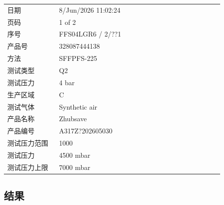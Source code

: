 \documentclass[UTF8,10pt,a4paper,fontset=fandol]{ctexart}
\newcommand{\fieldvalue}[1]{#1}
\begin{document}
\begin{tabular}{@{}p{0.22\linewidth}p{0.70\linewidth}@{}}
日期 &
\fieldvalue{8/Jun/2026 11:02:24} \\

页码 &
\fieldvalue{1 of 2} \\

序号 &
\fieldvalue{FFS04LGR6 / 2/??1} \\

产品号 &
\fieldvalue{328087444138} \\

方法 &
\fieldvalue{SFFPFS-225} \\

测试类型 &
\fieldvalue{Q2} \\

测试压力 &
\fieldvalue{4 bar} \\

生产区域 &
\fieldvalue{C} \\

测试气体 &
\fieldvalue{Synthetic air} \\

产品名称 &
\fieldvalue{Zhubsave} \\

产品编号 &
\fieldvalue{A317Z?202605030} \\

测试压力范围 &
\fieldvalue{1000} \\

测试压力 &
\fieldvalue{4500 mbar} \\

测试压力上限 &
\fieldvalue{7000 mbar} \\
\end{tabular}

\subsection{结果}
\end{document}
